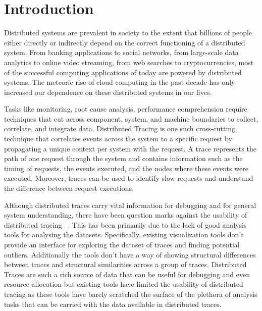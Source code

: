 \section{Introduction}

Distributed systems are prevalent in society to the extent that billions of people either directly or 
indirectly depend on the correct functioning of a distributed system. From banking applications to social
networks, from large-scale data analytics to online video streaming, from web searches to cryptocurrencies,
most of the successful computing applications of today are powered by distributed systems.
The meteoric rise of cloud computing in the past decade has only increased our dependence on these
distributed systems in our lives.

Tasks like monitoring, root cause analysis, performance comprehension require techniques that cut across component,
system, and machine boundaries to collect, correlate, and integrate data. Distributed Tracing is one such cross-cutting technique
that correlates events across the system to a specific request by propagating a unique context per system with the request.
A trace represents the path of one request through the system and contains information such as the timing of requests, 
the events executed, and the nodes where these events were executed. Moreover, traces can be used
to identify slow requests and understand the difference between request executions. 

Although distributed traces carry vital information for debugging and for general system understanding,
there have been question marks against the usability of distributed tracing ~\cite{sridharandisttracing,kleindisttracing}. This has been primarily
due to the lack of good analysis tools for analysing the datasets. Specifically, existing visualization
tools don't provide an interface for exploring the dataset of traces and finding potential outliers.
Additionally the tools don't have a way of showing structural differences between traces and 
structural similarities across a group of traces. Distributed Traces are such a rich source
of data that can be useful for debugging and even resource allocation but existing tools
have limited the usability of distributed tracing as these tools have barely scratched the surface
of the plethora of analysis tasks that can be carried with the data available
in distributed traces.

